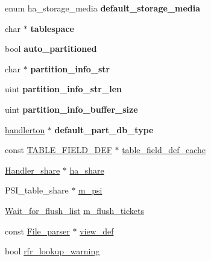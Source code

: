 \begin{DoxyCompactItemize}
enum ha\+\_\+storage\+\_\+media {\bfseries default\+\_\+storage\+\_\+media}
\item 
\mbox{\label{structTABLE__SHARE_ad916b8032c5b4752dcc3f3a4e8e73122}} 
char $\ast$ {\bfseries tablespace}
\item 
\mbox{\label{structTABLE__SHARE_abc667bb92ffaf26c47534487f138c3b9}} 
bool {\bfseries auto\+\_\+partitioned}
\item 
\mbox{\label{structTABLE__SHARE_a8188c2ec7195f2e944e137c3c55ce6c7}} 
char $\ast$ {\bfseries partition\+\_\+info\+\_\+str}
\item 
\mbox{\label{structTABLE__SHARE_ae7ac57eb29df9d2ddf7d6e4dd4f99e40}} 
uint {\bfseries partition\+\_\+info\+\_\+str\+\_\+len}
\item 
\mbox{\label{structTABLE__SHARE_a896a1d742942f0a3a9eab68ce9851fc7}} 
uint {\bfseries partition\+\_\+info\+\_\+buffer\+\_\+size}
\item 
\mbox{\label{structTABLE__SHARE_a95776e305df5a49446e9b3a12c8e9755}} 
\mbox{\hyperlink{structhandlerton}{handlerton}} $\ast$ {\bfseries default\+\_\+part\+\_\+db\+\_\+type}
\item 
const \mbox{\hyperlink{structst__table__field__def}{T\+A\+B\+L\+E\+\_\+\+F\+I\+E\+L\+D\+\_\+\+D\+EF}} $\ast$ \mbox{\hyperlink{structTABLE__SHARE_a2eae47fa6d1ab98ea2af1b1073170274}{table\+\_\+field\+\_\+def\+\_\+cache}}
\item 
\mbox{\hyperlink{classHandler__share}{Handler\+\_\+share}} $\ast$ \mbox{\hyperlink{structTABLE__SHARE_a20f65b925c665708bd19df8190115c66}{ha\+\_\+share}}
\item 
P\+S\+I\+\_\+table\+\_\+share $\ast$ \mbox{\hyperlink{structTABLE__SHARE_a40d5321098268634196a67766c666d93}{m\+\_\+psi}}
\item 
\mbox{\hyperlink{classI__P__List}{Wait\+\_\+for\+\_\+flush\+\_\+list}} \mbox{\hyperlink{structTABLE__SHARE_aa9f03d5defc37e2c2c919f59d77988a0}{m\+\_\+flush\+\_\+tickets}}
\item 
const \mbox{\hyperlink{classFile__parser}{File\+\_\+parser}} $\ast$ \mbox{\hyperlink{structTABLE__SHARE_a6d49595d1beeea24f9e653efaa0d41a2}{view\+\_\+def}}
\item 
bool \mbox{\hyperlink{structTABLE__SHARE_ada4f1d80a7e68e1f1bcc8715fbe55179}{rfr\+\_\+lookup\+\_\+warning}}
\end{DoxyCompactItemize}


